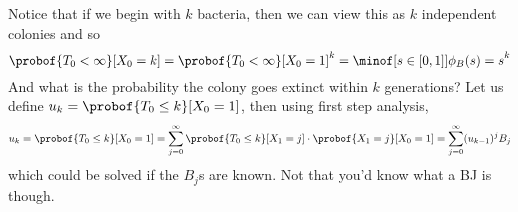 Notice that if we begin with $k$ bacteria, then we can view this as $k$ independent colonies and so
$$ \probof{T_0<\infty}[X_0=k] = \probof{T_0<\infty}[X_0=1]^k = \minof[s\in{[0,1]}]{\phi_B(s)=s}^k $$
And what is the probability the colony goes extinct within $k$ generations?
Let us define $u_k=\probof{T_0\leq k}[X_0=1]$, then using first step analysis,
$$ u_k = \probof{T_0\leq k}[X_0=1] = \sum_{j=0}^\infty\probof{T_0\leq k}[X_1=j]\cdot\probof{X_1=j}[X_0=1] = \sum_{j=0}^\infty (u_{k-1})^jB_j $$
which could be solved if the $B_j$s are known.
Not that you'd know what a BJ is though.

\bye

